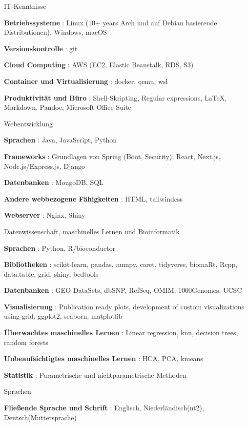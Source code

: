 \begin{cvskills}
    \cvskill
        { IT-Kenntnisse }
        {
            \begin{cvitems}
\item {\textbf{ Betriebssysteme }: Linux (10+ years Arch und auf Debian basierende Distributionen), Windows, macOS}
\item {\textbf{ Versionskontrolle }: git}
\item {\textbf{ Cloud Computing }: AWS (EC2, Elastic Beanstalk, RDS, S3)}
\item {\textbf{ Container und Virtualisierung }: docker, qemu, wsl}
\item {\textbf{ Produktivität und Büro }: Shell-Skripting, Regular expressions, LaTeX, Markdown, Pandoc, Microsoft Office Suite}
            \end{cvitems}
        }
    \cvskill
        { Webentwicklung }
        {
            \begin{cvitems}
\item {\textbf{ Sprachen }: Java, JavaScript, Python}
\item {\textbf{ Frameworks }: Grundlagen von Spring (Boot, Security), React, Next.js, Node.js/Express.js, Django}
\item {\textbf{ Datenbanken }: MongoDB, SQL}
\item {\textbf{ Andere webbezogene Fähigkeiten }: HTML, tailwindcss}
\item {\textbf{ Webserver }: Nginx, Shiny}
            \end{cvitems}
        }
    \cvskill
        { Datenwissenschaft, maschinelles Lernen und Bioinformatik }
        {
            \begin{cvitems}
\item {\textbf{ Sprachen }: Python, R/bioconductor}
\item {\textbf{ Bibliotheken }: scikit-learn, pandas, numpy, caret, tidyverse, biomaRt, Rcpp, data.table, grid, shiny, bedtools}
\item {\textbf{ Datenbanken }: GEO DataSets, dbSNP, RefSeq, OMIM, 1000Genomes, UCSC}
\item {\textbf{ Visualisierung }: Publication ready plots, development of custom visualizations using grid, ggplot2, seaborn, matplotlib}
\item {\textbf{ Überwachtes maschinelles Lernen }: Linear regression, knn, decision trees, random forests}
\item {\textbf{ Unbeaufsichtigtes maschinelles Lernen }: HCA, PCA, kmeans}
\item {\textbf{ Statistik }: Parametrische und nichtparametrische Methoden}
            \end{cvitems}
        }
    \cvskill
        { Sprachen }
        {
            \begin{cvitems}
\item {\textbf{ Fließende Sprache und Schrift }: Englisch, Niederländisch(nt2), Deutsch(Muttersprache)}
            \end{cvitems}
        }
\end{cvskills}